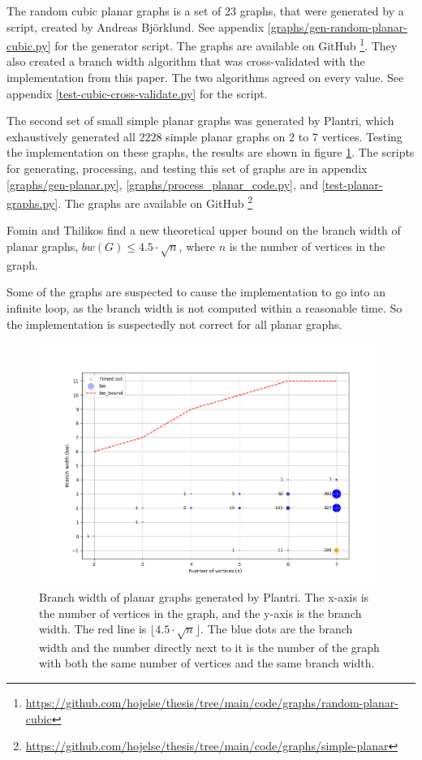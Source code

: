 \documentclass{article}
\begin{document}
	The random cubic planar graphs is a set of 23 graphs, that were generated by a script, created by Andreas Björklund. See appendix \ref{graphs/gen-random-planar-cubic.py} for the generator script. The graphs are available on GitHub \footnote{\url{https://github.com/hojelse/thesis/tree/main/code/graphs/random-planar-cubic}}. They also created a branch width algorithm that was cross-validated with the implementation from this paper. The two algorithms agreed on every value. See appendix \ref{test-cubic-cross-validate.py} for the script.

	The second set of small simple planar graphs was generated by Plantri, which exhaustively generated all $2228$ simple planar graphs on 2 to 7 vertices. Testing the implementation on these graphs, the results are shown in figure \ref{fig:bw-planar}. The scripts for generating, processing, and testing this set of graphs are in appendix \ref{graphs/gen-planar.py}, \ref{graphs/process_planar_code.py}, and \ref{test-planar-graphs.py}. The graphs are available on GitHub \footnote{\url{https://github.com/hojelse/thesis/tree/main/code/graphs/simple-planar}}

	Fomin and Thilikos\cite{FT06} find a new theoretical upper bound on the branch width of planar graphs, $bw(G) \leq 4.5 \cdot \sqrt{n}$, where $n$ is the number of vertices in the graph.

	Some of the graphs are suspected to cause the implementation to go into an infinite loop, as the branch width is not computed within a reasonable time. So the implementation is suspectedly not correct for all planar graphs.

	\begin{figure}[H]
		\centering
		\includegraphics[width=\textwidth]{./images/bw-planar.png}
		\caption{Branch width of planar graphs generated by Plantri. The x-axis is the number of vertices in the graph, and the y-axis is the branch width. The red line is $\lfloor 4.5 \cdot \sqrt{n} \rfloor$. The blue dots are the branch width and the number directly next to it is the number of the graph with both the same number of vertices and the same branch width.}
		\label{fig:bw-planar}
	\end{figure}
\end{document}
